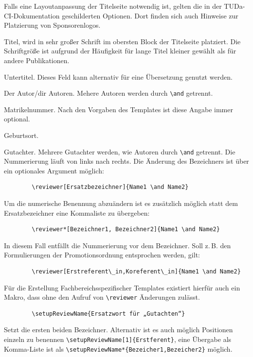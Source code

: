 \documentclass[
	ngerman,%
	accentcolor=9c,%
	ruledheaders=chapter,%
	class=book,%
	thesis={%
		type=dr,
		dr=rernat
	},
	fontsize=11pt,%
	parskip=half-,%
	custommargins=true,%
	marginpar=false,%
]{tudapub}
\begin{document}
Falls eine Layoutanpassung der Titelseite notwendig ist, gelten die in der TUDa-CI-Dokumentation \cite{tuda-ci}  geschilderten Optionen. Dort finden sich auch Hinweise zur Platzierung von Sponsorenlogos.

\begin{description}
	\item[title] Titel, wird in sehr großer Schrift im obersten Block der Titelseite platziert. Die Schriftgröße ist aufgrund der Häufigkeit für lange Titel kleiner gewählt als für andere Publikationen.
	\item[subtitle] Untertitel. Dieses Feld kann alternativ für eine Übersetzung genutzt werden.
	\item[author] Der Autor/dir Autoren. Mehere Autoren werden durch \verb+\and+ getrennt.
	\item[studentID] Matrikelnummer. Nach den Vorgaben des Templates ist diese Angabe immer optional.
	\item[birthplace] Geburtsort.
	\item[reviewer] Gutachter. Mehrere Gutachter werden, wie Autoren durch \verb+\and+ getrennt. Die Nummerierung läuft von links nach rechts.
	      Die Änderung des Bezeichners ist über ein optionales Argument möglich:
\begin{verbatim}
        \reviewer[Ersatzbezeichner]{Name1 \and Name2}
\end{verbatim}
	      Um die numerische Benennung abzuändern ist es zusätzlich möglich statt dem Ersatzbezeichner eine Kommaliste zu übergeben:
\begin{verbatim}
        \reviewer*[Bezeichner1, Bezeichner2]{Name1 \and Name2}
\end{verbatim}
	      In diesem Fall entfällt die Nummerierung vor dem Bezeichner. Soll z.\,B. den Formulierungen der Promotionsordnung entsprochen werden, gilt:
\begin{verbatim}
        \reviewer[Erstreferent\_in,Koreferent\_in]{Name1 \and Name2}
\end{verbatim}
	      Für die Erstellung Fachbereichsspezifischer Templates existiert hierfür auch ein Makro, dass ohne den Aufruf von \verb+\reviewer+ Änderungen zulässt.
\begin{verbatim}
        \setupReviewName{Ersatzwort für „Gutachten“}
\end{verbatim}
	      Setzt die ersten beiden Bezeichner. Alternativ ist es auch möglich Positionen einzeln zu benennen \verb+\setupReviewName[1]{Erstferent}+, eine Übergabe als Komma-Liste ist als \verb+\setupReviewName*{Bezeicher1,Bezeicher2}+ möglich.


\end{description}
\end{document}
